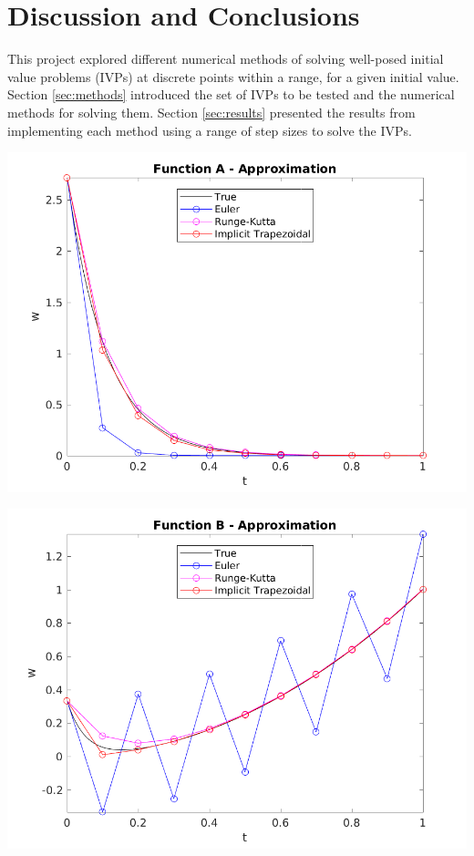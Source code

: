 \documentclass{article}
\begin{document}
\section{Discussion and Conclusions}
\label{sec:conc}

This project explored different numerical methods of solving well-posed initial value problems (IVPs) at discrete points within a range, for a given initial value. Section \ref{sec:methods} introduced the set of IVPs to be tested and the numerical methods for solving them. Section \ref{sec:results} presented the results from implementing each method using a range of step sizes to solve the IVPs.


\begin{center}
	\centering
    \begin{minipage}{0.5\textwidth}
        \centering
	    \includegraphics[width=1\textwidth]{../output/a_compare_val.png}
    \end{minipage}\hfill
    \begin{minipage}{0.5\textwidth}
        \centering
	    \includegraphics[width=1\textwidth]{../output/b_compare_val.png}
    \end{minipage}
 	\label{fig:compare_val}
\end{center}
\end{document}
